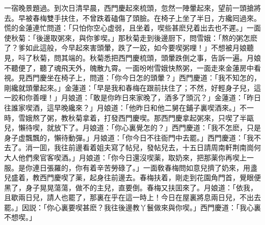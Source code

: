 一宿晚景題過。到次日清早晨，西門慶起來梳頭，忽然一陣暈起來，望前一頭搶將去。早被春梅雙手扶住，不曾跌着磕傷了頭臉。在椅子上坐了半日，方纔囘過來。慌的金蓮連忙問道：「只怕你空心虚弱，且坐着，喫些甚麽兒着出去也不遲。」一面使秋菊：「後邊取粥來，與你爹喫。」那秋菊走到後邊厨下，問雪娥：「熬的粥怎麽了？爹如此這般，今早起來害頭暈，跌了一跤，如今要喫粥哩！」不想被月娘聽見，呌了秋菊，問其端的。秋菊悉把西門慶梳頭，頭暈跌倒之事，告訴一遍。月娘不聽便了，聽了魂飛天外，魄散九霄。一面吩咐雪娥快熬粥，一面走來金蓮房中看視。見西門慶坐在椅子上，問道：「你今日怎的頭暈？」西門慶道：「我不知怎的，剛纔就頭暈起來。」金蓮道：「早是我和春梅在跟前扶住了；不然，好輕身子兒，這一跤和你善哩！」月娘道：「敢是你昨日來家晚了，酒多了頭沉？」金蓮道：「昨日往誰家喫酒，這早晚纔來？」月娘道：「他昨日和他二舅在鋪子裏喫酒來。」不一時，雪娥熬了粥，教秋菊拿着，打發西門慶喫。那西門慶拿起粥來，只喫了半甌兒，懶待喫，就放下了。月娘道：「你心裏覺怎的？」西門慶道：「我不怎麽，只是身子虚飄飄的，懶待動彈。」月娘道：「你今日不往衙門中去罷。」西門慶道：「我不去了。消一囬，我往前邊看着姐夫寫了帖兒，發帖兒去，十五日請周南軒荆南崗何大人他們衆官客喫酒。」月娘道：「你今日還沒喫薬，取奶來，把那薬你再喫上一服。是你連日張羅的，你有着辛苦勞碌了。」一面敎春梅問如意兒擠了奶來，用盞兒盛着，教西門慶喫了薬，起身往前邊去。春梅扶着，剛走到花園角門首，覺眼便黑了，身子晃晃蕩蕩，做不的主兒，直要倒。春梅又扶囬來了。月娘道：「依我，且歇兩日兒，請人也罷了，那裏在乎在這一時上！今日在屋裏將息兩日兒，不出去罷。」因説：「你心裏要喫甚麽？我往後邊教丫鬟做來與你喫。」西門慶道：「我心裏不想喫。」

